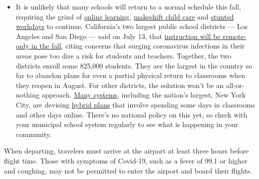 \begin{itemize}
  \begin{itemize}
  \tightlist
  \item
    It is unlikely that many schools will return to a normal schedule
    this fall, requiring the grind of
    \href{https://www.nytimes3xbfgragh.onion/2020/06/05/us/coronavirus-education-lost-learning.html?action=click\&pgtype=Article\&state=default\&region=MAIN_CONTENT_3\&context=storylines_faq}{online
    learning},
    \href{https://www.nytimes3xbfgragh.onion/2020/05/29/us/coronavirus-child-care-centers.html?action=click\&pgtype=Article\&state=default\&region=MAIN_CONTENT_3\&context=storylines_faq}{makeshift
    child care} and
    \href{https://www.nytimes3xbfgragh.onion/2020/06/03/business/economy/coronavirus-working-women.html?action=click\&pgtype=Article\&state=default\&region=MAIN_CONTENT_3\&context=storylines_faq}{stunted
    workdays} to continue. California's two largest public school
    districts --- Los Angeles and San Diego --- said on July 13, that
    \href{https://www.nytimes3xbfgragh.onion/2020/07/13/us/lausd-san-diego-school-reopening.html?action=click\&pgtype=Article\&state=default\&region=MAIN_CONTENT_3\&context=storylines_faq}{instruction
    will be remote-only in the fall}, citing concerns that surging
    coronavirus infections in their areas pose too dire a risk for
    students and teachers. Together, the two districts enroll some
    825,000 students. They are the largest in the country so far to
    abandon plans for even a partial physical return to classrooms when
    they reopen in August. For other districts, the solution won't be an
    all-or-nothing approach.
    \href{https://bioethics.jhu.edu/research-and-outreach/projects/eschool-initiative/school-policy-tracker/}{Many
    systems}, including the nation's largest, New York City, are
    devising
    \href{https://www.nytimes3xbfgragh.onion/2020/06/26/us/coronavirus-schools-reopen-fall.html?action=click\&pgtype=Article\&state=default\&region=MAIN_CONTENT_3\&context=storylines_faq}{hybrid
    plans} that involve spending some days in classrooms and other days
    online. There's no national policy on this yet, so check with your
    municipal school system regularly to see what is happening in your
    community.
  \end{itemize}
\end{itemize}

When departing, travelers must arrive at the airport at least three
hours before flight time. Those with symptoms of Covid-19, such as a
fever of 99.1 or higher and coughing, may not be permitted to enter the
airport and board their flights.

